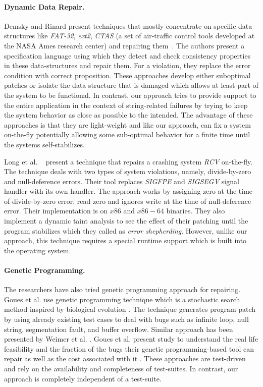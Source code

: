\paragraph{Dynamic Data Repair.}
Demsky and Rinard present techniques that mostly concentrate on specific
data-structures like \emph{FAT-32}, \emph{ext2}, \emph{CTAS} (a set of
air-traffic control tools developed at the NASA Ames research center) and
repairing them~\cite{Demsky03automaticdata, conf/issre/DemskyR03,conf/oopsla/DemskyR03,
conf/issta/DemskyEGMPR06}. The authors present a specification language using which they
detect and check consistency properties in these data-structures and repair them.
For a violation, they replace the error condition with correct proposition.
These approaches develop either suboptimal patches or
isolate the data structure that is damaged which allows at least part of the
system to be functional. In contrast,
our approach tries to provide support to the entire application in the context of string-related failures
by trying to keep the system behavior
as close as possible to the intended. The advantage of these approaches is that they are
light-weight and like our approach, can fix a system on-the-fly
potentially allowing some sub-optimal behavior for a finite time until the
systems self-stabilizes.

Long et al. ~\cite{conf/pldi/LongSR14}
present a technique that repairs a crashing system \emph{RCV} on-the-fly.
The technique deals with two types of system violations, namely, divide-by-zero and
null-deference errors. Their tool replaces \emph{SIGFPE} and \emph{SIGSEGV}
signal handler with its own handler. The approach works by assigning zero
at the time of divide-by-zero error, read zero and ignores write at the time of
null-deference error. Their implementation is on $x86$ and $x86-64$ binaries.
They also implement a dynamic taint analysis to see the effect of their
patching until the program stabilizes which they called as \emph{error
shepherding}. However, unlike our approach, this technique requires a special runtime support which is 
built into the operating system.

\paragraph{Genetic Programming.}
The researchers have also tried genetic programming approach for repairing.
Goues et al. use genetic programming technique which is a stochastic search
method inspired by biological evolution \cite{GouesNFW12}. The technique generates program patch
by using already existing test cases to deal with bugs such as infinite loop, null
string, segmentation fault, and buffer overflow. Similar approach has been presented by 
Weimer et al. \cite{WeimerFGN10}. Goues et al. present study to understand the real life feasibility and
the fraction of the bugs their genetic programming-based tool can repair as well as the cost associated
with it \cite{GouesDFW12}. These approaches are test-driven and rely on the availability and completeness of test-suites.
In contrast, our approach is completely independent of a test-suite.

